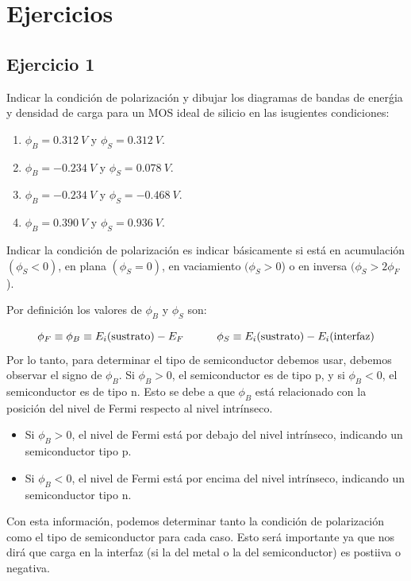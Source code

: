 
\section*{Ejercicios}



\begin{Enunciado}
	\subsection*{Ejercicio 1}

	Indicar la condición de polarización y dibujar los diagramas de bandas de enerǵia y densidad de carga para un MOS ideal de silicio en las isugientes condiciones:

	\begin{enumerate}[label=\alph*)]
		\item $\phi_B= \SI{0.312}{V}$  y  $\phi_S= \SI{0.312}{V}$.
		\item $\phi_B= -\SI{0.234}{V}$  y  $\phi_S= \SI{0.078}{V}$.
		\item $\phi_B= -\SI{0.234}{V}$  y  $\phi_S= -\SI{0.468}{V}$.
		\item $\phi_B= \SI{0.390}{V}$  y  $\phi_S= \SI{0.936}{V}$.
	\end{enumerate}
\end{Enunciado}

\vspace*{1em}

Indicar la condición de polarización es indicar básicamente si está en acumulación $(\phi_S<0)$, en plana $(\phi_S=0)$, en vaciamiento $(\phi_S>0$) o en inversa $(\phi_S>2\phi_F$).

Por definición los valores de $\phi_B$ y $\phi_S$ son:

\begin{equation*}
	\phi_F \equiv \phi_B \equiv E_i(\text{sustrato}) - E_F \quad \quad \quad
	\phi_S \equiv E_i(\text{sustrato}) - E_i (\text{interfaz})
\end{equation*}
Por lo tanto, para determinar el tipo de semiconductor debemos usar, debemos observar el signo de $\phi_B$. Si $\phi_B > 0$, el semiconductor es de tipo p, y si $\phi_B < 0$, el semiconductor es de tipo n. Esto se debe a que $\phi_B$ está relacionado con la posición del nivel de Fermi respecto al nivel intrínseco.
\begin{itemize}
	\item Si $\phi_B > 0$, el nivel de Fermi está por debajo del nivel intrínseco, indicando un semiconductor tipo p.
	\item Si $\phi_B < 0$, el nivel de Fermi está por encima del nivel intrínseco, indicando un semiconductor tipo n.
\end{itemize}
Con esta información, podemos determinar tanto la condición de polarización como el tipo de semiconductor para cada caso. Esto será importante ya que nos dirá que carga en la interfaz (si la del metal o la del semiconductor) es postiiva o negativa.


